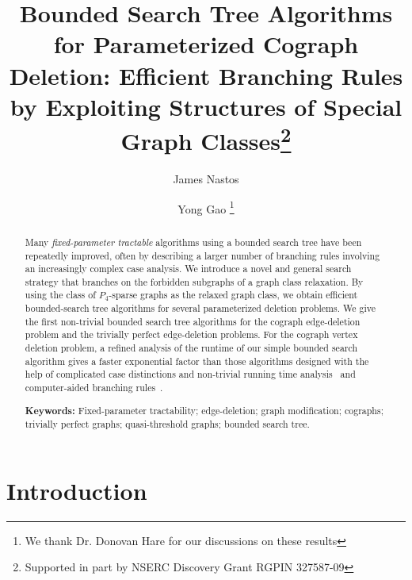 \documentclass{llncs}
\begin{document}
 

\title{Bounded Search Tree Algorithms for Parameterized Cograph Deletion: Efficient Branching Rules by Exploiting Structures of Special Graph Classes\thanks{Supported in part by NSERC Discovery Grant RGPIN 327587-09}}
\author{James Nastos \and Yong Gao \thanks{We thank Dr. Donovan Hare for our discussions on these results}}

\maketitle

\begin{abstract}
Many \emph{fixed-parameter tractable} algorithms using a bounded search tree have been repeatedly improved, often by describing a larger number of branching rules involving an increasingly complex case analysis. We introduce a novel and general search strategy that branches on the forbidden subgraphs of a graph class relaxation. By using the class of $P_4$-sparse graphs as the relaxed graph class, we obtain efficient bounded-search tree algorithms for several parameterized deletion problems. We give the first non-trivial bounded search tree algorithms for the cograph edge-deletion problem and the trivially perfect edge-deletion problems. For the cograph vertex deletion problem, a refined analysis of the runtime of our simple bounded search algorithm gives a faster exponential factor than those algorithms designed with the help of complicated case distinctions and non-trivial running time analysis~\cite{NiRo} and computer-aided branching rules~\cite{GGHN}.

\smallskip
\textbf{Keywords:} Fixed-parameter tractability; edge-deletion; graph modification; cographs; trivially perfect graphs; quasi-threshold graphs; bounded search tree.


\end{abstract}

\normalsize


\section{Introduction}
\end{document}
